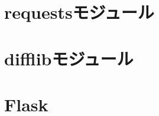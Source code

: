 \section{requestsモジュール}\label{sec:requests}

\section{difflibモジュール}\label{sec:difflib}

\section{Flask}\label{sec:Flask}